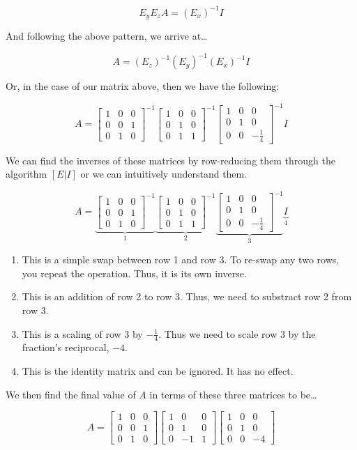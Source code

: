 \documentclass[12pt]{article}
\newcommand{\mb}{\begin{bmatrix}}
\newcommand{\me}{\end{bmatrix}}
\begin{document}
$$E_y E_z A = (E_x)^{-1}I$$

And following the above pattern, we arrive at\dots

$$A = (E_z)^{-1}(E_y)^{-1}(E_x)^{-1}I$$

Or, in the case of our matrix above, then we have the following:

$$A = \mb
1 & 0 & 0 \\
0 & 0 & 1 \\
0 & 1 & 0 
\me^{-1} \mb
1 & 0 & 0 \\
0 & 1 & 0 \\
0 & 1 & 1
\me^{-1} \mb
1 & 0 & 0 \\
0 & 1 & 0 \\
0 & 0 & -\frac{1}{4}
\me^{-1} I
$$

We can find the inverses of these matrices by row-reducing them through the algorithm $[E|I]$ or
we can intuitively understand them.

$$A = \underbrace{\mb
1 & 0 & 0 \\
0 & 0 & 1 \\
0 & 1 & 0 
\me^{-1}}_{1} \underbrace{\mb
1 & 0 & 0 \\
0 & 1 & 0 \\
0 & 1 & 1
\me^{-1}}_{2} \underbrace{\mb
1 & 0 & 0 \\
0 & 1 & 0 \\
0 & 0 & -\frac{1}{4}
\me^{-1}}_{3} \underbrace{I}_{4}
$$

\begin{enumerate}
    \item This is a simple swap between row 1 and row 3.
    To re-swap any two rows, you repeat the operation. Thus, it is its own inverse.
    \item This is an addition of row 2 to row 3. Thus, we need to substract row 2 from row 3.
    \item This is a scaling of row 3 by $-\frac{1}{4}$.
    Thus we need to scale row 3 by the fraction's reciprocal, $-4$.
    \item This is the identity matrix and can be ignored. It has no effect.
\end{enumerate}

We then find the final value of $A$ in terms of these three matrices to be\dots

$$A = \mb
1 & 0 & 0 \\
0 & 0 & 1 \\
0 & 1 & 0 
\me \mb
1 & 0 & 0 \\
0 & 1 & 0 \\
0 & -1 & 1
\me \mb
1 & 0 & 0 \\
0 & 1 & 0 \\
0 & 0 & -4
\me
$$
\end{document}
